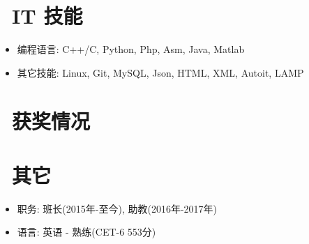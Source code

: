 \documentclass{resume}
\begin{document}

\section{\faCogs\ IT 技能}
\begin{itemize}[parsep=0.5ex]
	\item 编程语言: C++/C, Python, Php, Asm, Java, Matlab
	\item 其它技能: Linux, Git, MySQL, Json, HTML, XML, Autoit, LAMP
\end{itemize}

\section{\faHeartO\ 获奖情况}

\par
{}


		\section{\faInfo\ 其它}
		\begin{itemize}[parsep=0.5ex]
			\item 职务: 班长(2015年-至今), 助教(2016年-2017年)
			\item 语言: 英语 - 熟练(CET-6 553分)
		\end{itemize}

		
\end{document}
